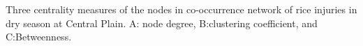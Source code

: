 Three centrality measures of the nodes in co-occurrence network of rice injuries in dry season at Central Plain. A: node degree, B:clustering coefficient, and C:Betweenness.
\label{fig:nodepropCP_ds}